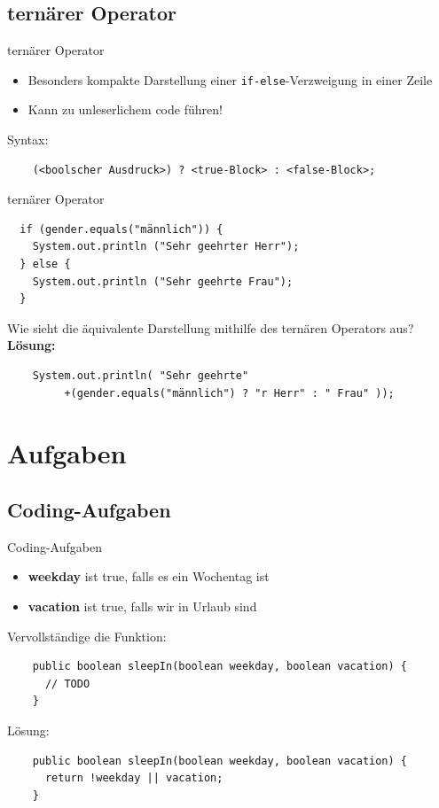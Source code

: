 \documentclass[18pt]{beamer}
\begin{document}
\subsection{ternärer Operator}
\begin{frame}[fragile]{ternärer Operator}
  \begin{itemize}
    \item Besonders kompakte Darstellung einer \lstinline$if-else$-Verzweigung in einer Zeile
    \item Kann zu unleserlichem code führen!
  \end{itemize}
  Syntax:
  \begin{lstlisting}
    (<boolscher Ausdruck>) ? <true-Block> : <false-Block>;
  \end{lstlisting}
\end{frame}

\begin{frame}[fragile]{ternärer Operator}
  \begin{lstlisting}
  if (gender.equals("männlich")) {
    System.out.println ("Sehr geehrter Herr");
  } else {
    System.out.println ("Sehr geehrte Frau");
  }
  \end{lstlisting}
  Wie sieht die äquivalente Darstellung mithilfe des ternären Operators aus?\\
  \pause
  \textbf{Lösung:}
  \begin{lstlisting}
    System.out.println( "Sehr geehrte" 
         +(gender.equals("männlich") ? "r Herr" : " Frau" ));
  \end{lstlisting}
\end{frame}

\section{Aufgaben}
\subsection{Coding-Aufgaben}
\begin{frame}[fragile]{Coding-Aufgaben}
	\begin{itemize}
    \item \textbf{weekday} ist true, falls es ein Wochentag ist
    \item \textbf{vacation} ist true, falls wir in Urlaub sind
  \end{itemize}
  Vervollständige die Funktion:
  \begin{lstlisting}
    public boolean sleepIn(boolean weekday, boolean vacation) {
      // TODO
    }
  \end{lstlisting}
  \pause
  Lösung:
  \begin{lstlisting}
    public boolean sleepIn(boolean weekday, boolean vacation) {
      return !weekday || vacation;
    }
  \end{lstlisting}
\end{frame}
\end{document}

